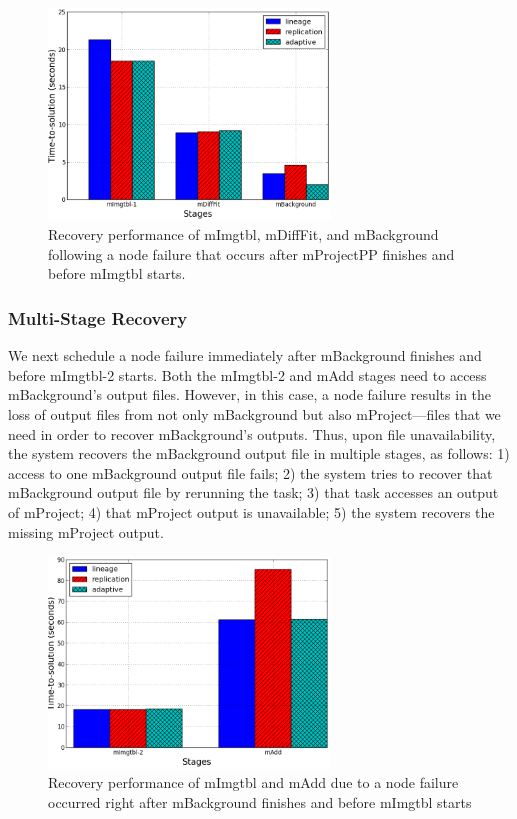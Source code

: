 \documentclass{sig-alternate}
\begin{document}
\begin{figure}[ht]
        \begin{center}
                \includegraphics[width=75mm]{pictures/kill-mProjectPP}
                \vspace{-10pt}
                \caption{Recovery performance of mImgtbl, mDiffFit, and mBackground following a node failure that occurs after mProjectPP finishes and before mImgtbl starts.
                \label{fig:montage-fail-mProjectPP}}
        \end{center}
\end{figure}

\subsubsection{Multi-Stage Recovery}
We next schedule a node failure immediately after mBackground finishes and before mImgtbl-2 starts.
Both the mImgtbl-2 and mAdd stages need to access mBackground's output files.
However, in this case, a node failure results in the loss of output files from not only mBackground but also mProject---files
that we need in order to recover mBackground's outputs.
Thus, upon file unavailability, the system recovers the mBackground output file in multiple stages, as follows:
1) access to one mBackground output file fails;
2) the system tries to recover that mBackground output file by rerunning the task;
3) that task accesses an output of mProject;
4) that mProject output is unavailable;
5) the system recovers the missing mProject output.

\begin{figure}[h]
        \begin{center}
                \includegraphics[width=75mm]{pictures/kill-mBack}
                \vspace{-10pt}
                \caption{Recovery performance of mImgtbl and mAdd due to a node failure occurred right after mBackground finishes and before mImgtbl starts
                \label{fig:montage-fail-mBackground}}
        \end{center}
\end{figure}
\end{document}

